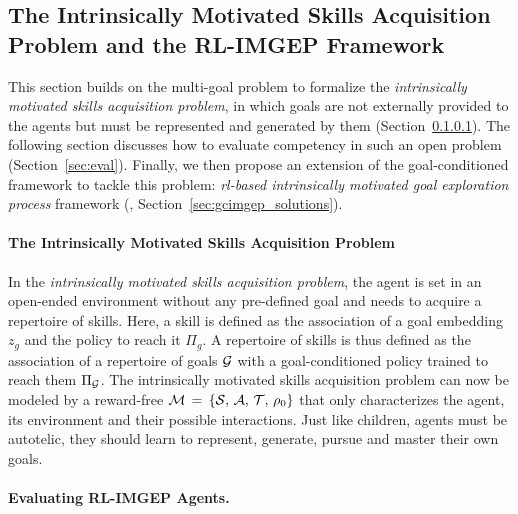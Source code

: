 


\subsection{The Intrinsically Motivated Skills Acquisition Problem and the RL-IMGEP Framework}
\label{sec:im_pb_solution}
This section builds on the multi-goal \rl problem to formalize the \textit{intrinsically motivated skills acquisition problem}, in which goals are not externally provided to the agents but must be represented and generated by them (Section~\ref{sec:im_pb}). The following section discusses how to evaluate competency in such an open problem (Section~\ref{sec:eval}). Finally, we then propose an extension of the goal-conditioned \rl framework to tackle this problem: \textit{\textsl{rl}-based intrinsically motivated goal exploration process} framework (\rlimgep, Section~\ref{sec:gcimgep_solutions}). 

\paragraph{The Intrinsically Motivated Skills Acquisition Problem}
\label{sec:im_pb}
In the \textit{intrinsically motivated skills acquisition problem}, the agent is set in an open-ended environment without any pre-defined goal and needs to acquire a repertoire of skills. Here, a skill is defined as the association of a goal embedding $z_g$ and the policy to reach it $\Pi_g$. A repertoire of skills is thus defined as the association of a repertoire of goals $\mathcal{G}$ with a goal-conditioned policy trained to reach them $\Pi_{\mathcal{G}}$. The intrinsically motivated skills acquisition problem can now be modeled by a reward-free \mdp $\mathcal{M}\,=\,\{\mathcal{S},\, \mathcal{A},\, \mathcal{T},\, \rho_0\}$ that only characterizes the agent, its environment and their possible interactions. Just like children, agents must be autotelic, \ie they should learn to represent, generate, pursue and master their own goals.


\label{sec:eval}
\paragraph{Evaluating RL-IMGEP Agents. } 


